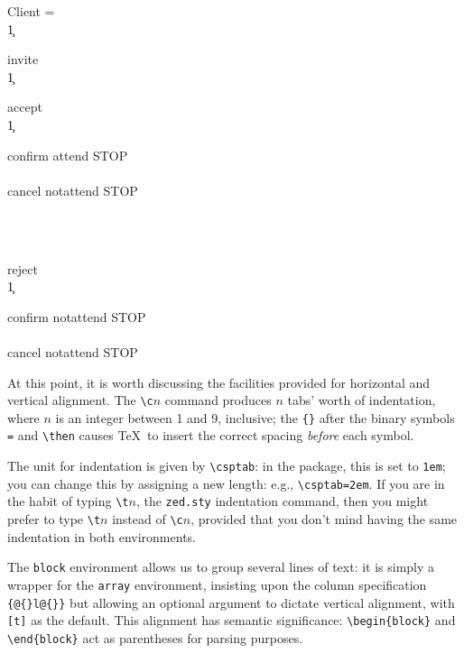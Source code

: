 \documentclass[fleqn,a4paper]{article}
\begin{document}
\begin{process}[DiaryOne]
  Client = {} \\ \c1 
  \begin{block}
    invite \then {} \\ \c1 
    \begin{block}
      accept \then {} \\ \c1
      \begin{block}
        confirm \then attend \then STOP \\
        \extchoice \\
        cancel \then notattend \then STOP 
      \end{block} \\
      \intchoice \\
      \begin{block}
        reject \then {} \\ \c1
        \begin{block}
          confirm \then notattend \then STOP \\
          \extchoice \\
          cancel \then notattend \then STOP 
        \end{block}
      \end{block}
    \end{block}
  \end{block}
\end{process}
At this point, it is worth discussing the facilities provided for
horizontal and vertical alignment.  The \verb=\c=$n$ command produces
$n$ tabs' worth of indentation, where $n$ is an integer between 1 and
9, inclusive; the \verb={}= after the binary symbols \verb|=| and
\verb=\then= causes \TeX\ to insert the correct spacing \emph{before}
each symbol.

The unit for indentation is given by \verb=\csptab=: in the package,
this is set to \verb=1em=; you can change this by assigning a new
length: e.g., \verb|\csptab=2em|.  If you are in the habit of typing
\verb=\t=$n$, the \verb=zed.sty= indentation command, then you might
prefer to type \verb=\t=$n$ instead of \verb=\c=$n$, provided that you
don't mind having the same indentation in both environments.

The \verb=block= environment allows us to group several lines of text:
it is simply a wrapper for the \verb=array= environment, insisting
upon the column specification \verb={@{}l@{}}= but allowing an
optional argument to dictate vertical alignment, with \verb=[t]= as
the default.  This alignment has semantic significance:
\verb=\begin{block}= and \verb=\end{block}= act as parentheses for
parsing purposes.
\end{document}
